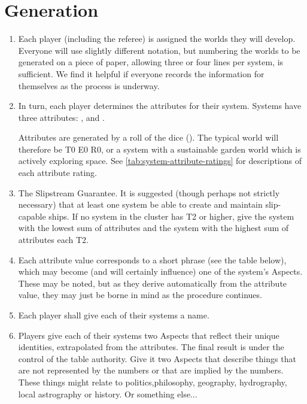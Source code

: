 \section{Generation}\label{sec:Generation} %

\begin{enumerate}
\item Each player (including the referee) is assigned the worlds they will develop. Everyone will use slightly different notation, but numbering the worlds to be generated on a piece of paper, allowing three or four lines per system, is sufficient. We find it helpful if everyone records the information for themselves as the process is underway.

\item In turn, each player determines the attributes for their system. Systems have three attributes:
,  and .

%

Attributes are generated by a roll of the dice (\dF). The typical world will therefore be T0 E0 R0, or a system with a sustainable garden world which is actively exploring space. See \autoref{tab:system-attribute-ratings} for descriptions of each attribute rating.

\item The Slipstream Guarantee. It is suggested (though perhaps not strictly necessary) that at least one system be able to create and maintain slip-capable ships. If no system in the cluster has T2 or higher, give the system with the lowest sum of attributes and the system with the highest sum of attributes each T2.

\item Each attribute value corresponds to a short phrase (see the table below), which may become (and will certainly influence) one of the system's Aspects. These may be noted, but as they derive automatically from the attribute value, they may just be borne in mind as the procedure continues.

\item Each player shall give each of their systems a name.

\item Players give each of their systems two Aspects that reflect their unique identities, extrapolated from the attributes. The final result is under the control of the table authority. Give it two Aspects that describe things that are not represented by the numbers or that are implied by the numbers. These things might relate to politics,philosophy, geography, hydrography, local astrography or history. Or something else...


\end{enumerate}
